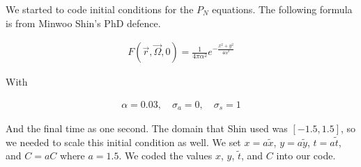 
We started to code initial conditions for the $P_N$ equations. The following formula is from Minwoo Shin's PhD defence.

\begin{align*}
F(\vec{r}, \vec{\Omega}, 0) = \frac{1}{4\pi\alpha^2}e^{-\frac{x^2+y^2}{4\alpha^2}}
\end{align*}

With 

\begin{align*}
\alpha = 0.03, \quad
\sigma _a = 0, \quad
\sigma _s = 1
\end{align*}

And the final time as one second. The domain that Shin used was $[-1.5, 1.5]$, so we needed to scale this initial condition as well. We set $x = a\tilde{x}$, $y = a\tilde{y}$, $t = a\tilde{t}$, and $C = aC$ where $a = 1.5$. We coded the values $x$, $y$, $\tilde{t}$, and $C$ into our code.


